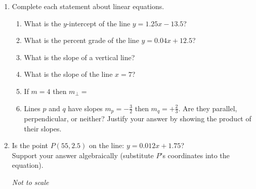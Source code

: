 \documentclass[12pt, twoside]{article}
\begin{document}
\begin{enumerate}
\newpage
\item Complete each statement about linear equations.
\begin{enumerate}[itemsep=0.5cm]
  \item What is the $y$-intercept of the line $y = 1.25x - 13.5$?
  \item What is the percent grade of the line $\displaystyle y = 0.04x + 12.5$?
  \item What is the slope of a vertical line?
  \item What is the slope of the line $x=7$?

    \item If $m = 4$ then $m_{\perp}=$
    \item Lines $p$ and $q$ have slopes $m_p = -\frac{3}{2}$ then $m_q= +\frac{2}{3}$. Are they parallel, perpendicular, or neither? Justify your answer by showing the product of their slopes.
  \end{enumerate}

\newpage
\item Is the point $P(55,2.5)$ on the line: $y=0.012x+1.75$? \\[0.5cm]
Support your answer algebraically (substitute $P$'s coordinates into the equation).
\begin{flushright}
  \emph{Not to scale}\\
  \end{flushright}


\end{enumerate}
\end{document}
